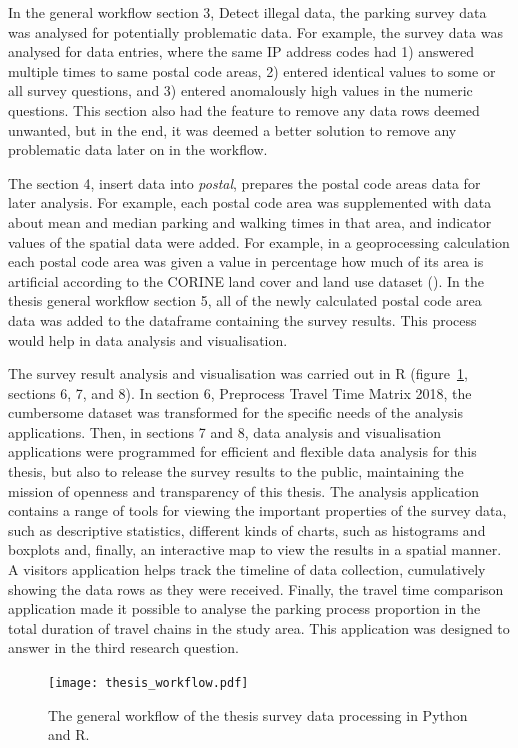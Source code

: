 In the general workflow section 3, Detect illegal data, the parking survey data was analysed for potentially problematic data. For example, the survey data was analysed for data entries, where the same IP address codes had 1) answered multiple times to same postal code areas, 2) entered identical values to some or all survey questions, and 3) entered anomalously high values in the numeric questions. This section also had the feature to remove any data rows deemed unwanted, but in the end, it was deemed a better solution to remove any problematic data later on in the workflow. 

The section 4, insert data into \textit{postal}, prepares the postal code areas data for later analysis. For example, each postal code area was supplemented with data about mean and median parking and walking times in that area, and indicator values of the spatial data were added. For example, in a geoprocessing calculation each postal code area was given a value in percentage how much of its area is artificial according to the CORINE land cover and land use dataset (\cite{FinnishEnvironmentInstitute2018}). In the thesis general workflow section 5, all of the newly calculated postal code area data was added to the dataframe containing the survey results. This process would help in data analysis and visualisation.

The survey result analysis and visualisation was carried out in R (figure~\ref{fig:gen_workflow}, sections 6, 7, and 8). In section 6, Preprocess Travel Time Matrix 2018, the cumbersome dataset was transformed for the specific needs of the analysis applications. Then, in sections 7 and 8, data analysis and visualisation applications were programmed for efficient and flexible data analysis for this thesis, but also to release the survey results to the public, maintaining the mission of openness and transparency of this thesis. The analysis application contains a range of tools for viewing the important properties of the survey data, such as descriptive statistics, different kinds of charts, such as histograms and boxplots and, finally, an interactive map to view the results in a spatial manner. A visitors application helps track the timeline of data collection, cumulatively showing the data rows as they were received. Finally, the travel time comparison application made it possible to analyse the parking process proportion in the total duration of travel chains in the study area. This application was designed to answer in the third research question.

\newpage
\begin{figure}[H]
    \centering
    \texttt{[image: thesis\_workflow.pdf]}
    \caption{The general workflow of the thesis survey data processing in Python and R.}
    \label{fig:gen_workflow}
\end{figure}

